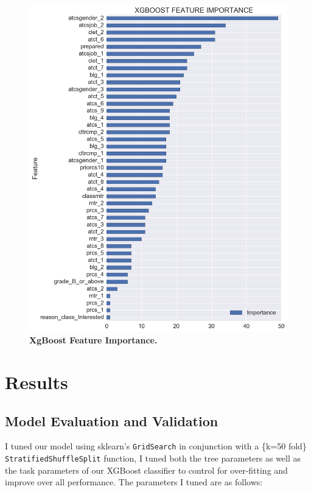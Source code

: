 \begin{figure}[!hbtp]
\centering
    \includegraphics[width=1\textwidth]{figures/featureImportance}
    \caption{\textbf{XgBoost Feature Importance. }\textit{}}\label{importance}
\end{figure}




\chapter*{Results}


\section*{Model Evaluation and Validation}

I tuned our model using sklearn's \texttt{GridSearch} in conjunction with a \{k=50 fold\} \texttt{StratifiedShuffleSplit} function, I tuned both the tree parameters as well as the task parameters of our XGBoost classifier to control for over-fitting and improve over all performance. The parameters I tuned are as follows:

